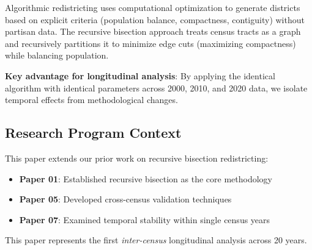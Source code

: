 Algorithmic redistricting uses computational optimization to generate districts based on explicit criteria (population balance, compactness, contiguity) without partisan data. The recursive bisection approach \citep{karypis1998metis} treats census tracts as a graph and recursively partitions it to minimize edge cuts (maximizing compactness) while balancing population.

\textbf{Key advantage for longitudinal analysis}: By applying the identical algorithm with identical parameters across 2000, 2010, and 2020 data, we isolate temporal effects from methodological changes.

\subsection{Research Program Context}

This paper extends our prior work on recursive bisection redistricting:
\begin{itemize}
    \item \textbf{Paper 01}: Established recursive bisection as the core methodology
    \item \textbf{Paper 05}: Developed cross-census validation techniques
    \item \textbf{Paper 07}: Examined temporal stability within single census years
\end{itemize}

This paper represents the first \textit{inter-census} longitudinal analysis across 20 years.
